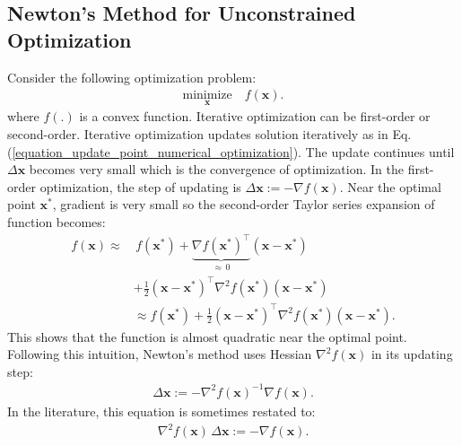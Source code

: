 \documentclass[lang=cn,10pt]{gorgeousnbook}
\numberwithin{equation}{section}%
\numberwithin{figure}{section}%
\begin{document}
\subsection{Newton's Method for Unconstrained Optimization}

Consider the following optimization problem:
\begin{align}
\underset{\boldsymbol{x}}{\text{minimize}}\quad f(\boldsymbol{x}).
\end{align}
where $f(.)$ is a convex function.
Iterative optimization can be first-order or second-order. Iterative optimization updates solution iteratively as in Eq. (\ref{equation_update_point_numerical_optimization}).
The update continues until $\Delta\boldsymbol{x}$ becomes very small which is the convergence of optimization.
In the first-order optimization, the step of updating is $\Delta\boldsymbol{x} := -\nabla f(\boldsymbol{x})$.
Near the optimal point $\boldsymbol{x}^*$, gradient is very small so the second-order Taylor series expansion of function becomes:
\begin{align}
f(\boldsymbol{x}) \approx &\,f(\boldsymbol{x}^*) + \underbrace{\nabla f(\boldsymbol{x}^*)^\top}_{\approx\, 0} (\boldsymbol{x} - \boldsymbol{x}^*) \nonumber\\
&+ \frac{1}{2} (\boldsymbol{x} - \boldsymbol{x}^*)^\top \nabla^2 f(\boldsymbol{x}^*) (\boldsymbol{x} - \boldsymbol{x}^*) \nonumber\\
&\approx f(\boldsymbol{x}^*) + \frac{1}{2} (\boldsymbol{x} - \boldsymbol{x}^*)^\top \nabla^2 f(\boldsymbol{x}^*) (\boldsymbol{x} - \boldsymbol{x}^*). \label{equation_Newton_method_Taylor_expansion}
\end{align}
This shows that the function is almost quadratic near the optimal point. Following this intuition, Newton's method uses Hessian $\nabla^2 f(\boldsymbol{x})$ in its updating step:
\begin{align}\label{equation_Newton_method_step}
\Delta\boldsymbol{x} := - \nabla^2 f(\boldsymbol{x})^{-1} \nabla f(\boldsymbol{x}).
\end{align}
In the literature, this equation is sometimes restated to:
\begin{align}\label{equation_Newton_method_step_2}
\nabla^2 f(\boldsymbol{x})\, \Delta\boldsymbol{x} := - \nabla f(\boldsymbol{x}).
\end{align}
\end{document}
